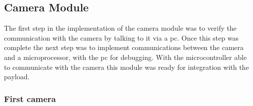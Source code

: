 \subsection{Camera Module}
\label{sec:John_Implementation}

The first step in the implementation of the camera module was to verify the communication with the camera by talking to it via a pc. Once this step was complete the next step was to implement communications between the camera and a microprocessor, with the pc for debugging. With the microcontroller able to communicate with the camera this module was ready for integration with the payload.

\subsubsection{First camera}
